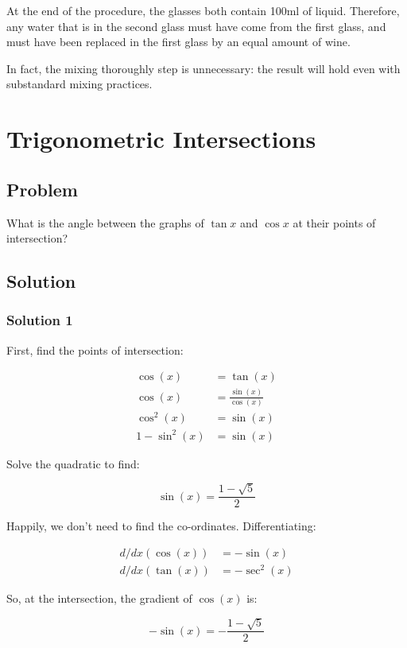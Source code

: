 \documentclass{article}
\begin{document}
At the end of the procedure, the glasses both contain 100ml of liquid. Therefore, any water that is in the second glass must have come from the first glass, and must have been replaced in the first glass by an equal amount of wine.

In fact, the mixing thoroughly step is unnecessary: the result will hold even with substandard mixing practices.

\newpage
\section{Trigonometric Intersections}

\subsection{Problem}

What is the angle between the graphs of \(\tan x\) and \(\cos x\) at their points of intersection?
\subsection{Solution}
\subsubsection{Solution 1}
First, find the points of intersection:

\begin{align*}
\cos(x)&=\tan(x)\\
\cos(x)&=\frac{\sin(x)}{\cos(x)}\\
\cos^2(x)&=\sin(x)\\
1-\sin^2(x)&=\sin(x)
\end{align*}

Solve the quadratic to find:

\begin{equation*}
\sin(x)=\frac{1-\sqrt{5}}{2}
\end{equation*}

Happily, we don't need to find the co-ordinates. Differentiating:

\begin{align*}
d/dx(\cos(x))&=-\sin(x)\\
d/dx(\tan(x))&=-\sec^2(x)
\end{align*}

So, at the intersection, the gradient of \(\cos(x)\) is:

\begin{equation*}
-\sin(x)=-\frac{1-\sqrt{5}}{2}
\end{equation*}
\end{document}
